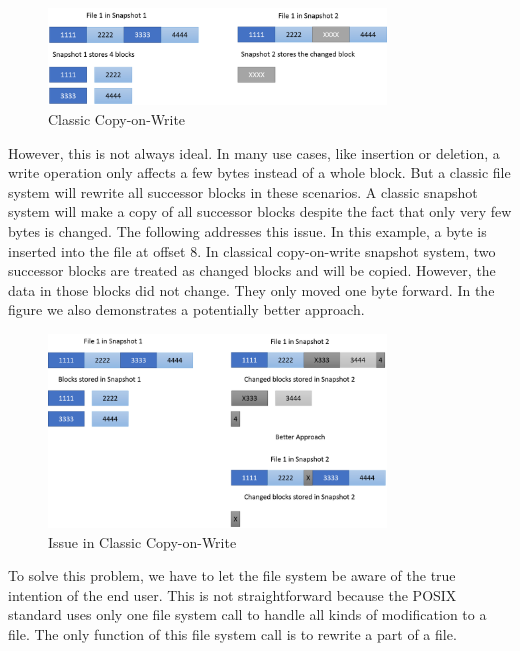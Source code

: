 \begin{figure}[t]
\centering
\includegraphics[width=0.8\textwidth]{Chapter-4/figs/fig4.png}
\caption{Classic Copy-on-Write}
\label{fig:classic_cow}
\end{figure}

    However, this is not always ideal. In many use cases, like insertion or deletion, a write operation only affects a few bytes instead of a whole block. But a classic file system will rewrite all successor blocks in these scenarios. A classic snapshot system will make a copy of all successor blocks despite the fact that only very few bytes is changed. The following  addresses this issue. In this example, a byte is inserted into the file at offset 8. In classical copy-on-write snapshot system, two successor blocks are treated as changed blocks and will be copied. However, the data in those blocks did not change. They only moved one byte forward. In the figure we also demonstrates a potentially better approach.

\begin{figure}[t]
\centering
\includegraphics[width=0.8\textwidth]{Chapter-4/figs/fig5.png}
\caption{Issue in Classic Copy-on-Write}
\label{fig:issue_classic_cow}
\end{figure}
 
    To solve this problem, we have to let the file system be aware of the true intention of the end user. This is not straightforward because the POSIX standard uses only one file system call to handle all kinds of modification to a file. The only function of this file system call is to rewrite a part of a file.
    
